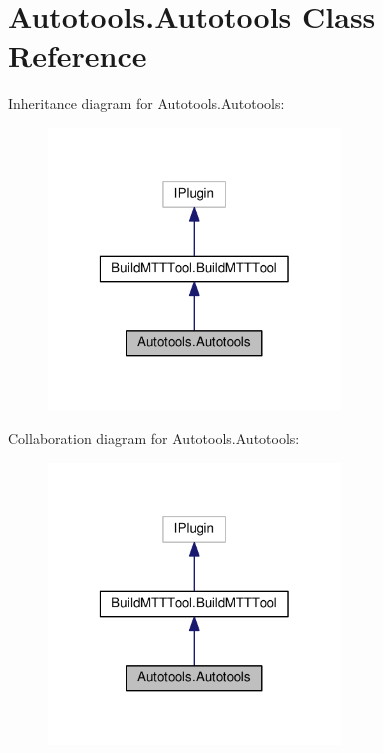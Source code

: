 \hypertarget{class_autotools_1_1_autotools}{\section{Autotools.\-Autotools Class Reference}
\label{class_autotools_1_1_autotools}
}


Inheritance diagram for Autotools.\-Autotools\-:
\nopagebreak
\begin{figure}[H]
\begin{center}
\leavevmode
\includegraphics[width=220pt]{class_autotools_1_1_autotools__inherit__graph}
\end{center}
\end{figure}


Collaboration diagram for Autotools.\-Autotools\-:
\nopagebreak
\begin{figure}[H]
\begin{center}
\leavevmode
\includegraphics[width=220pt]{class_autotools_1_1_autotools__coll__graph}
\end{center}
\end{figure}

